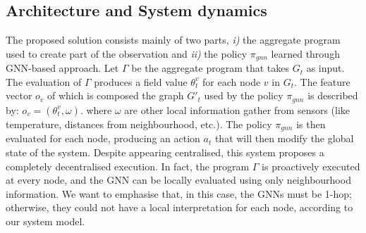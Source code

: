 \documentclass[conference]{IEEEtran}
\begin{document}
\subsection{Architecture and System dynamics}
The proposed solution consists mainly of two parts, 
\emph{i)} the aggregate program used to create part of the observation and 
\emph{ii)} the policy $\pi_{gnn}$ learned through \ac{GNN}-based approach. 
%
Let $\Gamma$ be the aggregate program that takes $G_t$ as input. 
%
The evaluation of $\Gamma$ produces a field value $\theta^v_t$ for each node $v$ in $G_t$. 
The feature vector $o_v$ of which is composed the graph $G'_t$ used by the policy $\pi_{gnn}$ is described by:
 $o_v = (\theta^v_t, \omega)$.
 where $\omega$ are other local information gather from sensors (like temperature, distances from neighbourhood, etc.). 
%
The policy $\pi_{gnn}$ is then evaluated for each node, 
 producing an action $a_t$ that will then modify the global state of the system.
%
Despite appearing centralised, this system proposes a completely decentralised execution. 
%
In fact, the program $\Gamma$ is proactively executed at every node, 
and the \ac{GNN} can be locally evaluated using only neighbourhood information. 
%
We want to emphasise that, in this case, the \acp{GNN} must be 1-hop; 
otherwise, they could not have a local interpretation for each node, according to our system model.
\end{document}
